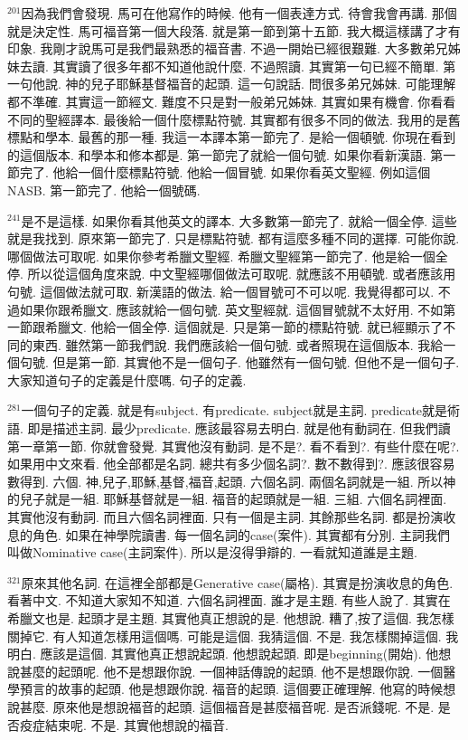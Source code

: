 \documentclass{book}
\begin{document}
$^{201}$因為我們會發現.
馬可在他寫作的時候.
他有一個表達方式.
待會我會再講.
那個就是決定性.
馬可福音第一個大段落.
就是第一節到第十五節.
我大概這樣講了才有印象.
我剛才說馬可是我們最熟悉的福音書.
不過一開始已經很艱難.
大多數弟兄姊妹去讀.
其實讀了很多年都不知道他說什麼.
不過照讀.
其實第一句已經不簡單.
第一句他說.
神的兒子耶穌基督福音的起頭.
這一句說話.
問很多弟兄姊妹.
可能理解都不準確.
其實這一節經文.
難度不只是對一般弟兄姊妹.
其實如果有機會.
你看看不同的聖經譯本.
最後給一個什麼標點符號.
其實都有很多不同的做法.
我用的是舊標點和學本.
最舊的那一種.
我這一本譯本第一節完了.
是給一個頓號.
你現在看到的這個版本.
和學本和修本都是.
第一節完了就給一個句號.
如果你看新漢語.
第一節完了.
他給一個什麼標點符號.
他給一個冒號.
如果你看英文聖經.
例如這個NASB.
第一節完了.
他給一個號碼.

$^{241}$是不是這樣.
如果你看其他英文的譯本.
大多數第一節完了.
就給一個全停.
這些就是我找到.
原來第一節完了.
只是標點符號.
都有這麼多種不同的選擇.
可能你說.
哪個做法可取呢.
如果你參考希臘文聖經.
希臘文聖經第一節完了.
他是給一個全停.
所以從這個角度來說.
中文聖經哪個做法可取呢.
就應該不用頓號.
或者應該用句號.
這個做法就可取.
新漢語的做法.
給一個冒號可不可以呢.
我覺得都可以.
不過如果你跟希臘文.
應該就給一個句號.
英文聖經就.
這個冒號就不太好用.
不如第一節跟希臘文.
他給一個全停.
這個就是.
只是第一節的標點符號.
就已經顯示了不同的東西.
雖然第一節我們說.
我們應該給一個句號.
或者照現在這個版本.
我給一個句號.
但是第一節.
其實他不是一個句子.
他雖然有一個句號.
但他不是一個句子.
大家知道句子的定義是什麼嗎.
句子的定義.

$^{281}$一個句子的定義.
就是有subject.
有predicate.
subject就是主詞.
predicate就是術語.
即是描述主詞.
最少predicate.
應該最容易去明白.
就是他有動詞在.
但我們讀第一章第一節.
你就會發覺.
其實他沒有動詞.
是不是?.
看不看到?.
有些什麼在呢?.
如果用中文來看.
他全部都是名詞.
總共有多少個名詞?.
數不數得到?.
應該很容易數得到.
六個.
神,兒子,耶穌,基督,福音,起頭.
六個名詞.
兩個名詞就是一組.
所以神的兒子就是一組.
耶穌基督就是一組.
福音的起頭就是一組.
三組.
六個名詞裡面.
其實他沒有動詞.
而且六個名詞裡面.
只有一個是主詞.
其餘那些名詞.
都是扮演收息的角色.
如果在神學院讀書.
每一個名詞的case(案件).
其實都有分別.
主詞我們叫做Nominative case(主詞案件).
所以是沒得爭辯的.
一看就知道誰是主題.

$^{321}$原來其他名詞.
在這裡全部都是Generative case(屬格).
其實是扮演收息的角色.
看著中文.
不知道大家知不知道.
六個名詞裡面.
誰才是主題.
有些人說了.
其實在希臘文也是.
起頭才是主題.
其實他真正想說的是.
他想說.
糟了,按了這個.
我怎樣關掉它.
有人知道怎樣用這個嗎.
可能是這個.
我猜這個.
不是.
我怎樣關掉這個.
我明白.
應該是這個.
其實他真正想說起頭.
他想說起頭.
即是beginning(開始).
他想說甚麼的起頭呢.
他不是想跟你說.
一個神話傳說的起頭.
他不是想跟你說.
一個醫學預言的故事的起頭.
他是想跟你說.
福音的起頭.
這個要正確理解.
他寫的時候想說甚麼.
原來他是想說福音的起頭.
這個福音是甚麼福音呢.
是否派錢呢.
不是.
是否疫症結束呢.
不是.
其實他想說的福音.
\end{document}
